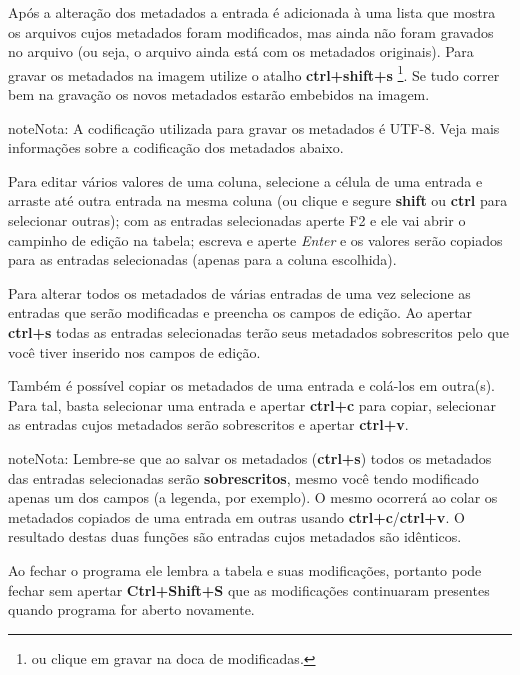\documentclass[letterpaper,10pt,portuguese]{manual}
\begin{document}
Após a alteração dos metadados a entrada é adicionada à uma lista que mostra os
arquivos cujos metadados foram modificados, mas ainda não foram gravados no
arquivo (ou seja, o arquivo ainda está com os metadados originais). Para gravar
os metadados na imagem utilize o atalho \textbf{ctrl+shift+s} \footnote{
ou clique em gravar na doca de modificadas.
}. Se tudo correr
bem na gravação os novos metadados estarão embebidos na imagem.

\begin{notice}{note}{Nota:}
A codificação utilizada para gravar os metadados é UTF-8. Veja mais
informações sobre a codificação dos metadados abaixo.
\end{notice}

Para editar vários valores de uma coluna, selecione a célula de uma entrada e
arraste até outra entrada na mesma coluna (ou clique e segure \textbf{shift} ou
\textbf{ctrl} para selecionar outras); com as entradas selecionadas aperte F2 e ele
vai abrir o campinho de edição na tabela; escreva e aperte \emph{Enter} e os valores
serão copiados para as entradas selecionadas (apenas para a coluna escolhida).

Para alterar todos os metadados de várias entradas de uma vez selecione as
entradas que serão modificadas e preencha os campos de edição. Ao apertar
\textbf{ctrl+s} todas as entradas selecionadas terão seus metadados
sobrescritos pelo que você tiver inserido nos campos de edição.

Também é possível copiar os metadados de uma entrada e colá-los em outra(s).
Para tal, basta selecionar uma entrada e apertar \textbf{ctrl+c} para copiar,
selecionar as entradas cujos metadados serão sobrescritos e apertar \textbf{ctrl+v}.

\begin{notice}{note}{Nota:}
Lembre-se que ao salvar os metadados (\textbf{ctrl+s}) todos os metadados das
entradas selecionadas serão \textbf{sobrescritos}, mesmo você tendo modificado
apenas um dos campos (a legenda, por exemplo). O mesmo ocorrerá ao colar os
metadados copiados de uma entrada em outras usando \textbf{ctrl+c}/\textbf{ctrl+v}. O
resultado destas duas funções são entradas cujos metadados são idênticos.
\end{notice}

Ao fechar o programa ele lembra a tabela e suas modificações, portanto pode
fechar sem apertar \textbf{Ctrl+Shift+S} que as modificações continuaram presentes
quando programa for aberto novamente.
\end{document}
